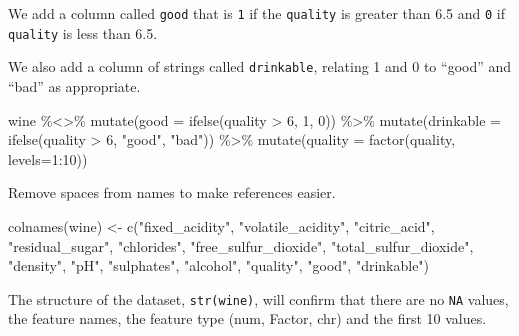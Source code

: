 \documentclass[
]{article}
\newenvironment{Shaded}{\begin{snugshade}}{\end{snugshade}}
\newcommand{\AttributeTok}[1]{\textcolor[rgb]{0.77,0.63,0.00}{#1}}
\newcommand{\DecValTok}[1]{\textcolor[rgb]{0.00,0.00,0.81}{#1}}
\newcommand{\FunctionTok}[1]{\textcolor[rgb]{0.00,0.00,0.00}{#1}}
\newcommand{\NormalTok}[1]{#1}
\newcommand{\OtherTok}[1]{\textcolor[rgb]{0.56,0.35,0.01}{#1}}
\newcommand{\SpecialCharTok}[1]{\textcolor[rgb]{0.00,0.00,0.00}{#1}}
\newcommand{\StringTok}[1]{\textcolor[rgb]{0.31,0.60,0.02}{#1}}
\begin{document}
We add a column called \texttt{good} that is \texttt{1} if the
\texttt{quality} is greater than 6.5 and \texttt{0} if \texttt{quality}
is less than 6.5.

We also add a column of strings called \texttt{drinkable}, relating 1
and 0 to ``good'' and ``bad'' as appropriate.

\begin{Shaded}
\begin{Highlighting}[]
\NormalTok{ wine }\SpecialCharTok{\%\textless{}\textgreater{}\%}
  \FunctionTok{mutate}\NormalTok{(}\AttributeTok{good =} \FunctionTok{ifelse}\NormalTok{(quality }\SpecialCharTok{\textgreater{}} \DecValTok{6}\NormalTok{, }\DecValTok{1}\NormalTok{, }\DecValTok{0}\NormalTok{)) }\SpecialCharTok{\%\textgreater{}\%}
  \FunctionTok{mutate}\NormalTok{(}\AttributeTok{drinkable =} \FunctionTok{ifelse}\NormalTok{(quality }\SpecialCharTok{\textgreater{}} \DecValTok{6}\NormalTok{, }\StringTok{"good"}\NormalTok{, }\StringTok{"bad"}\NormalTok{)) }\SpecialCharTok{\%\textgreater{}\%}
  \FunctionTok{mutate}\NormalTok{(}\AttributeTok{quality =} \FunctionTok{factor}\NormalTok{(quality, }\AttributeTok{levels=}\DecValTok{1}\SpecialCharTok{:}\DecValTok{10}\NormalTok{))}
\end{Highlighting}
\end{Shaded}

Remove spaces from names to make references easier.

\begin{Shaded}
\begin{Highlighting}[]
\FunctionTok{colnames}\NormalTok{(wine) }\OtherTok{\textless{}{-}} \FunctionTok{c}\NormalTok{(}\StringTok{"fixed\_acidity"}\NormalTok{, }\StringTok{"volatile\_acidity"}\NormalTok{, }\StringTok{"citric\_acid"}\NormalTok{,}
                      \StringTok{"residual\_sugar"}\NormalTok{, }\StringTok{"chlorides"}\NormalTok{, }\StringTok{"free\_sulfur\_dioxide"}\NormalTok{,}
                      \StringTok{"total\_sulfur\_dioxide"}\NormalTok{, }\StringTok{"density"}\NormalTok{, }\StringTok{"pH"}\NormalTok{, }\StringTok{"sulphates"}\NormalTok{,}
                      \StringTok{"alcohol"}\NormalTok{, }\StringTok{"quality"}\NormalTok{, }\StringTok{"good"}\NormalTok{, }\StringTok{"drinkable"}\NormalTok{)}
\end{Highlighting}
\end{Shaded}

The structure of the dataset, \texttt{str(wine)}, will confirm that
there are no \texttt{NA} values, the feature names, the feature type
(num, Factor, chr) and the first 10 values.
\end{document}
